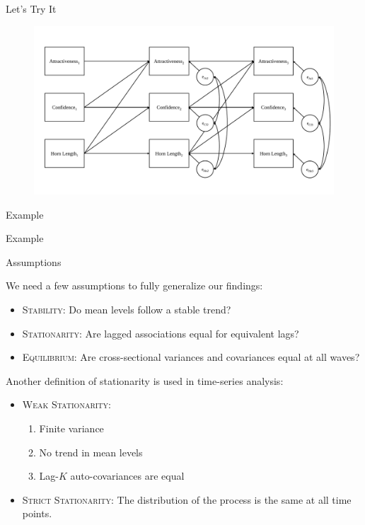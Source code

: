 \documentclass{beamer}
\newcommand{\va}[0]{\vspace{12pt}}
\newcommand{\vb}[0]{\vspace{6pt}}
\newcommand{\vc}[0]{\vspace{3pt}}
\begin{document}
\begin{frame}{Let's Try It}

  \begin{figure}
    \includegraphics[width=\textwidth]{figures/examplePathDiagram.pdf}
  \end{figure}

\end{frame}


\begin{frame}[allowframebreaks]{Example}



\end{frame}


\begin{frame}[allowframebreaks]{Example}
  


\end{frame}



\begin{frame}{Assumptions}
  
  We need a few assumptions to fully generalize our findings:
  \vb
  \begin{itemize} 
  \item \textsc{Stability:} Do mean levels follow a stable trend?  
    \vb
  \item \textsc{Stationarity:} Are lagged associations equal for
    equivalent lags?  
    \vb
  \item \textsc{Equilibrium:} Are cross-sectional variances and
    covariances equal at all waves?
  \end{itemize}
  \va
  Another definition of stationarity is used in time-series analysis:
  \begin{itemize}
  \item \textsc{Weak Stationarity:}
    \vc
    \begin{enumerate}
    \item Finite variance
      \vc
    \item No trend in mean levels
      \vc
    \item Lag-$K$ auto-covariances are equal
    \end{enumerate}
    \vb
  \item \textsc{Strict Stationarity:} The distribution of the process is
    the same at all time points.
  \end{itemize}
  
\end{frame}
\end{document}
